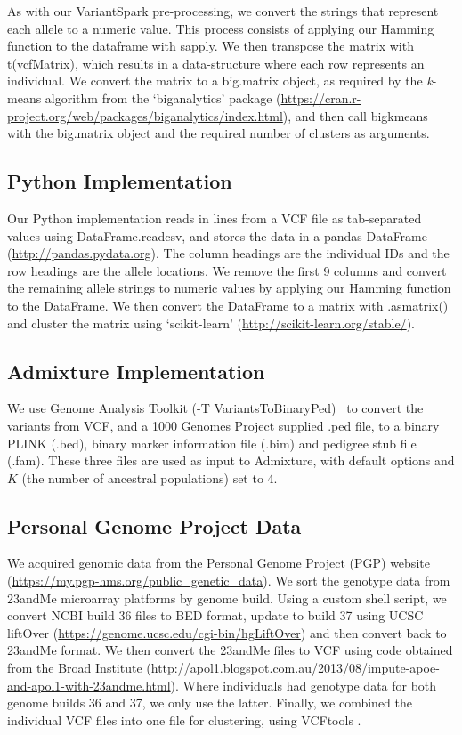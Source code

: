\documentclass{bmcart}
\newcommand{\variantSpark}{{\sc VariantSpark}}
\newcommand{\kMeans}{\textit{k}-means}
\begin{document}
As with our \variantSpark{} pre-processing, we convert the strings that represent each allele to a numeric value. 
This process consists of applying our {\sc Hamming} function to the dataframe with {\sc sapply}.
We then transpose the matrix with {\sc t(vcfMatrix)}, which results in a data-structure where each row represents an individual. We convert the matrix to a {\sc big.matrix} object,
as required by the \kMeans{} algorithm from the `biganalytics' package (\url{https://cran.r-project.org/web/packages/biganalytics/index.html}), and then call {\sc bigkmeans} with
the {\sc big.matrix} object and the required number of clusters as arguments.

\subsection*{Python Implementation}
Our Python implementation reads in lines from a VCF file as tab-separated values using {\sc DataFrame.read\textunderscore{}csv}, and stores the data in a pandas DataFrame (\url{http://pandas.pydata.org}). The column headings are the individual IDs and the row headings are the allele locations.
We remove the first 9 columns and convert the remaining allele strings to numeric values by applying our {\sc Hamming} function to the DataFrame.
We then convert the DataFrame to a matrix with {\sc .as\textunderscore{}matrix()} and cluster the matrix using `scikit-learn' (\url{http://scikit-learn.org/stable/}).

\subsection*{{\sc Admixture} Implementation}
We use Genome Analysis Toolkit ({\sc -T VariantsToBinaryPed})~\cite{McKenna2010} to convert the variants from VCF, and a 1000 Genomes Project supplied .ped file, to a binary PLINK (.bed), binary marker information file (.bim) and pedigree stub file (.fam).
These three files are used as input to {\sc Admixture}, with default options and $K$ (the number of ancestral populations) set to 4.

\subsection*{Personal Genome Project Data}
We acquired genomic data from the Personal Genome Project (PGP) website (\url{https://my.pgp-hms.org/public_genetic_data}). We sort the genotype data from 23andMe microarray platforms by genome 
build. Using a custom shell script, we convert NCBI build 36 files to BED format, update to build 37 using UCSC liftOver (\url{https://genome.ucsc.edu/cgi-bin/hgLiftOver}) and 
then convert back to 23andMe format. We then convert the 23andMe files to VCF using code obtained from the Broad Institute (\url{http://apol1.blogspot.com.au/2013/08/impute-apoe-and-apol1-with-23andme.html}). 
Where individuals had genotype data for both genome builds 36 and 37, we only use the latter. Finally, we combined the individual VCF files into one 
file for clustering, using VCFtools \cite{Danecek2011Variant}.
\end{document}
